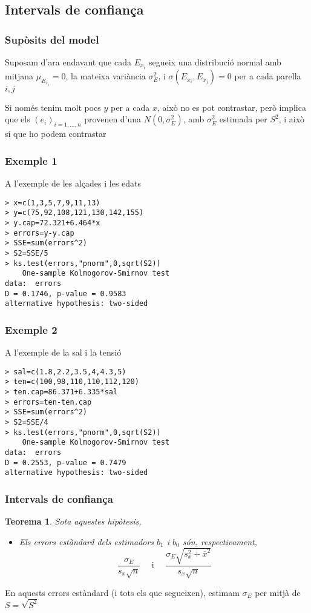 \documentclass[12pt,t]{beamer}
\renewcommand{\emph}[1]{{\color{red}#1}}
\theoremstyle{plain}
\newtheorem{teorema}{Teorema}
\theoremstyle{definition}
\begin{document}
\subsection{Intervals de confiança}

\begin{frame}
\frametitle{Supòsits del model}

Suposam d'ara endavant que \emph{cada $E_{x_i}$ segueix una distribució normal amb mitjana $\mu_{E_{x_i}}=0$, la mateixa variància $\sigma_E^2$, i $\sigma(E_{x_i},E_{x_j})=0$ per a cada parella $i,j$}
\bigskip

Si només tenim molt pocs $y$ per a cada $x$, això no es pot contrastar, però implica que els $(e_i)_{i=1,\ldots,n}$ provenen d'una $N(0,\sigma_E^2)$, amb $\sigma_E^2$ estimada per $S^2$, i això sí que ho podem contrastar
\end{frame}

\begin{frame}[fragile]
\frametitle{Exemple 1}
A l'exemple de les alçades i les edats
\begin{verbatim}
> x=c(1,3,5,7,9,11,13)
> y=c(75,92,108,121,130,142,155)
> y.cap=72.321+6.464*x
> errors=y-y.cap
> SSE=sum(errors^2)
> S2=SSE/5
> ks.test(errors,"pnorm",0,sqrt(S2))
	One-sample Kolmogorov-Smirnov test
data:  errors
D = 0.1746, p-value = 0.9583
alternative hypothesis: two-sided
\end{verbatim}
\end{frame}

\begin{frame}[fragile]
\frametitle{Exemple 2}
A l'exemple de la sal i la tensió
\begin{verbatim}
> sal=c(1.8,2.2,3.5,4,4.3,5)
> ten=c(100,98,110,110,112,120)
> ten.cap=86.371+6.335*sal
> errors=ten-ten.cap
> SSE=sum(errors^2)
> S2=SSE/4
> ks.test(errors,"pnorm",0,sqrt(S2))
	One-sample Kolmogorov-Smirnov test
data:  errors
D = 0.2553, p-value = 0.7479
alternative hypothesis: two-sided
\end{verbatim}
\end{frame}

\begin{frame}
\frametitle{Intervals de confiança}
\begin{teorema}
Sota aquestes hipòtesis,
\begin{itemize}
\item Els errors estàndard dels estimadors $b_1$ i $b_0$ són, respectivament,
$$
\frac{\sigma_E}{s_x\sqrt{n}}\quad\mbox{ i }\quad \frac{\sigma_E\sqrt{s_x^2+\overline{x}^2}}{s_x\sqrt{n}}
$$
\end{itemize}
\end{teorema}
\medskip

En aquests errors estàndard (i tots els que segueixen), estimam $\sigma_E$ per mitjà de $S=\sqrt{S^2}$

\end{frame}
\end{document}

